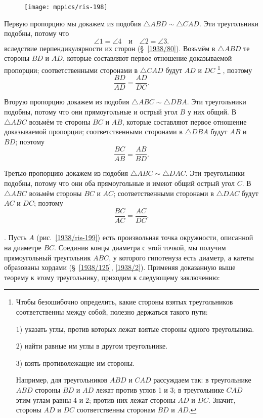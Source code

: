 \documentclass[oneside]{book}
\begin{document}
\begin{figure}
\centering
\texttt{[image: mppics/ris-198]}
\caption{}\label{1938/ris-198}
\end{figure}

Первую пропорцию мы докажем из подобия $\triangle ABD\sim \triangle CAD$.
Эти треугольники подобны, потому что
\[\angle 1 = \angle 4\quad \text{и} \quad\angle 2 = \angle 3.\]
вследствие перпендикулярности их сторон (§~\ref{1938/80}).
Возьмём в $\triangle ABD$ те стороны $BD$ и $AD$, которые составляют первое отношение доказываемой пропорции;
соответственными сторонами в $\triangle CAD$ будут $AD$ и $DC$%
\footnote{Чтобы безошибочно определить, какие стороны взятых треугольников соответственны между собой, полезно держаться такого пути:

1) указать углы, против которых лежат взятые стороны одного треугольника.

2) найти равные им углы в другом треугольнике.

3) взять противолежащие им стороны.

Например, для треугольников $ABD$ и $CAD$ рассуждаем так:
в треугольнике $ABD$ стороны $BD$ и $AD$ лежат против углов 1 и 3;
в треугольнике $CAD$ этим углам равны 4 и 2;
против них лежат стороны $AD$ и $DC$.
Значит, стороны $AD$ и $DC$ соответственны сторонам $BD$ и $AD$.
}%
, поэтому
\[\frac{BD}{AD}=\frac{AD}{DC}.\]

Вторую пропорцию докажем из подобия $\triangle ABC\sim \triangle DBA$.
Эти треугольники подобны, потому что они прямоугольные и острый угол $B$ у них общий.
В $\triangle ABC$ возьмём те стороны $BC$ и $AB$, которые составляют первое отношение доказываемой пропорции;
соответственными сторонами в $\triangle DBA$ будут $AB$ и $BD$;
поэтому
\[\frac{BC}{AB}=\frac{AB}{BD}.\]

Третью пропорцию докажем из подобия $\triangle ABC\sim \triangle DAC$.
Эти треугольники подобны, потому что они оба прямоугольные и имеют общий острый угол $C$.
В $\triangle ABC$ возьмём стороны $BC$ и $AC$;
соответственными сторонами в $\triangle DAC$ будут $AC$ и $DC$;
поэтому
\[\frac{BC}{AC}=\frac{AC}{DC}.\]

\paragraph{}\label{1938/189}
\mbox{.}
Пусть $A$ (рис.~\ref{1938/ris-199}) есть произвольная точка окружности, описанной на диаметре $BC$.
Соединив концы диаметра с этой точкой, мы получим прямоугольный треугольник $ABC$, у которого гипотенуза есть диаметр, а катеты образованы хордами (§~\ref{1938/125}, \ref{1938/2}).
Применяя доказанную выше теорему к этому треугольнику, приходим к следующему заключению:
\end{document}

